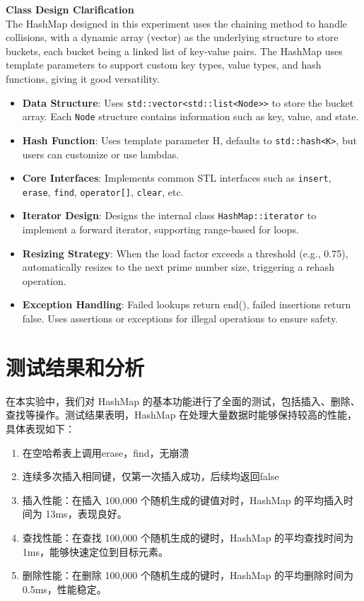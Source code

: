 \documentclass{article}
\begin{document}
    \bigskip
    \textbf{Class Design Clarification}\\
    
    The HashMap designed in this experiment uses the chaining method to handle collisions, with a dynamic array (vector) as the underlying structure to store buckets, each bucket being a linked list of key-value pairs. The HashMap uses template parameters to support custom key types, value types, and hash functions, giving it good versatility.
    
\begin{itemize}
    \item \textbf{Data Structure}: Uses \texttt{std::vector<std::list<Node>>} to store the bucket array. Each \texttt{Node} structure contains information such as key, value, and state.
    \item \textbf{Hash Function}: Uses template parameter H, defaults to \texttt{std::hash<K>}, but users can customize or use lambdas.
    \item \textbf{Core Interfaces}: Implements common STL interfaces such as \texttt{insert}, \texttt{erase}, \texttt{find}, \texttt{operator[]}, \texttt{clear}, etc.
    \item \textbf{Iterator Design}: Designs the internal class \texttt{HashMap::iterator} to implement a forward iterator, supporting range-based for loops.
    \item \textbf{Resizing Strategy}: When the load factor exceeds a threshold (e.g., 0.75), automatically resizes to the next prime number size, triggering a rehash operation.
    \item \textbf{Exception Handling}: Failed lookups return end(), failed insertions return false. Uses assertions or exceptions for illegal operations to ensure safety.
\end{itemize}
\section{测试结果和分析}%
    在本实验中，我们对 HashMap 的基本功能进行了全面的测试，包括插入、删除、查找等操作。测试结果表明，HashMap 在处理大量数据时能够保持较高的性能，具体表现如下：
    \begin{enumerate}
        \item 在空哈希表上调用erase，find，无崩溃
        \item 连续多次插入相同键，仅第一次插入成功，后续均返回false
        \item 插入性能：在插入 100,000 个随机生成的键值对时，HashMap 的平均插入时间为 13ms，表现良好。
        \item 查找性能：在查找 100,000 个随机生成的键时，HashMap 的平均查找时间为 1ms，能够快速定位到目标元素。
        \item 删除性能：在删除 100,000 个随机生成的键时，HashMap 的平均删除时间为 0.5ms，性能稳定。
    \end{enumerate}
\end{document}
